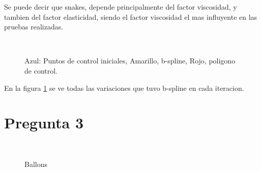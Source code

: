 \documentclass[a4paper,10pt]{article}
\begin{document}
Se puede decir que snakes, depende principalmente del factor viscosidad, y tambien del factor elasticidad, siendo el factor viscosidad el mas influyente en las pruebas realizadas.
\begin{figure}[ht!]
  \centering
  ~ 
  ~ 
  \caption{Azul: Puntos de control iniciales, Amarillo, b-spline, Rojo, poligono de control. }
  \label{fig:p2b}
\end{figure}
En la figura \ref{fig:p2b} se ve todas las variaciones que tuvo b-spline en cada iteracion.

\newpage
\section{Pregunta 3}
\begin{figure}[ht!]
  \centering
  ~ 
  ~ 
  \caption{Ballons}
  \label{fig:p4}
\end{figure}
\end{document}
